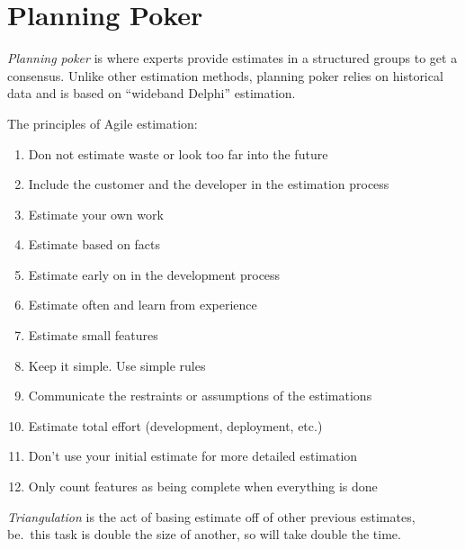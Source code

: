 \section{Planning Poker}\label{sec:planning_poker}

\emph{Planning poker} is where experts provide estimates in a structured groups to get a consensus.
Unlike other estimation methods, planning poker relies on historical data and is based on ``wideband Delphi'' estimation.

The principles of Agile estimation:
\begin{enumerate}
    \item Don not estimate waste or look too far into the future
    \item Include the customer and the developer in the estimation process
    \item Estimate your own work
    \item Estimate based on facts
    \item Estimate early on in the development process
    \item Estimate often and learn from experience
    \item Estimate small features
    \item Keep it simple. Use simple rules
    \item Communicate the restraints or assumptions of the estimations
    \item Estimate total effort (development, deployment, etc.)
    \item Don't use your initial estimate for more detailed estimation
    \item Only count features as being complete when everything is done
\end{enumerate}
%
\emph{Triangulation} is the act of basing estimate off of other previous estimates, be.\ this task is double the size of another, so will take double the time.

